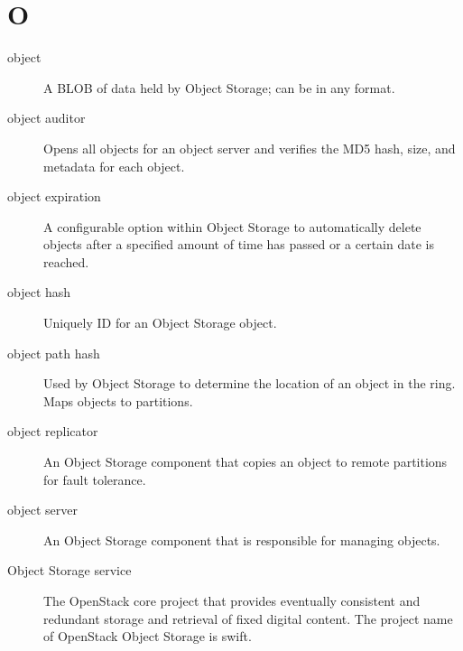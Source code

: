 \documentclass[letterpaper,10pt,english]{sphinxmanual}
\begin{document}
\section{O}
\label{_source/glossary:o}\begin{description}
\item[{object}] \leavevmode{}\label{_source/glossary:term-object}
A BLOB of data held by Object Storage; can be in any
format.

\item[{object auditor}] \leavevmode{}\label{_source/glossary:term-object-auditor}
Opens all objects for an object server and verifies the MD5
hash, size, and metadata for each object.

\item[{object expiration}] \leavevmode{}\label{_source/glossary:term-object-expiration}
A configurable option within Object Storage to automatically
delete objects after a specified amount of time has passed or a
certain date is reached.

\item[{object hash}] \leavevmode{}\label{_source/glossary:term-object-hash}
Uniquely ID for an Object Storage object.

\item[{object path hash}] \leavevmode{}\label{_source/glossary:term-object-path-hash}
Used by Object Storage to determine the location of an object in
the ring. Maps objects to partitions.

\item[{object replicator}] \leavevmode{}\label{_source/glossary:term-object-replicator}
An Object Storage component that copies an object to remote
partitions for fault tolerance.

\item[{object server}] \leavevmode{}\label{_source/glossary:term-object-server}
An Object Storage component that is responsible for managing
objects.

\item[{Object Storage service}] \leavevmode{}\label{_source/glossary:term-object-storage-service}
The OpenStack core project that provides eventually consistent
and redundant storage and retrieval of fixed digital content. The
project name of OpenStack Object Storage is swift.


\end{description}
\end{document}
